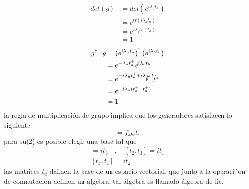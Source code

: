 \documentclass[../main.tex]{subfiles}
\begin{document}
\begin{align*}
  det(g) & = det(e^{i\lambda_a t_a}) \\
  & = e^{tr(i\lambda_a t_a)} \\
  & = e^{i\lambda_a tr(t_a)} \\
  & = 1
\end{align*}
        \begin{align*}
          g^\dagger \cdot g & = \left( e^{i\lambda_a t_a} \right)^\dagger \left( e^{i\lambda_b t_b} \right) \\
          & = e^{-\lambda_a t_a^+} e^{i\lambda_b t_b} \\
          & = e^{-i\lambda_a t_a^+ + i\lambda_{{\cancel{b}}^a} t_{\cancel{b}^a} } \\
          & = e^{-i\lambda_a (t_a^+-t_a^+)} \\
          & = 1
        \end{align*}
la regla de multiplicación de grupo implica que los generadores satisfacen lo siguiente
        \begin{equation*}
          [t_a,t_b] = f_{abc} t_c 
        \end{equation*}
para su(2) es posible elegir una base tal que
        \begin{align*}
          [t_1,t_2] = it_3 \quad , \quad [t_2,t_3] = it_1 \\
          [t_3,t_1] = it_2
        \end{align*}
        las matrices $t_a$ definen la base de un espacio vectorial, que junto a la operaci´on de conmutación definen un álgebra, tal álgebra es llamado álgebra de lie. 
\end{document}
